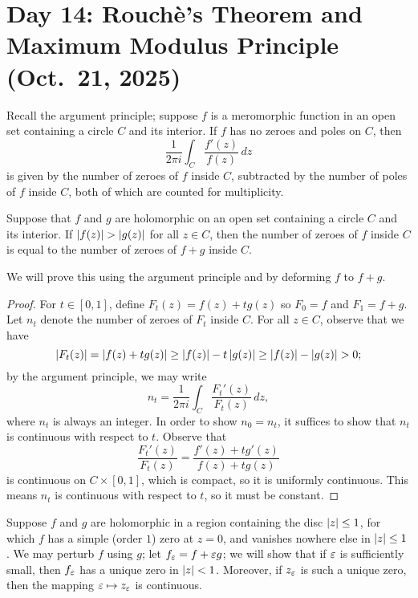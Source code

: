 \section{Day 14: Rouch\`e's Theorem and Maximum Modulus Principle (Oct.\ 21, 2025)}
Recall the argument principle; suppose $f$ is a meromorphic function in an open set containing a circle $C$ and its interior. If $f$ has no zeroes and poles on $C$, then
\[ \frac{1}{2\pi i} \int_C \frac{f'(z)}{f(z)} \, dz \]
is given by the number of zeroes of $f$ inside $C$, subtracted by the number of poles of $f$ inside $C$, both of which are counted for multiplicity.
\begin{theorem}
    Suppose that $f$ and $g$ are holomorphic on an open set containing a circle $C$ and its interior. If $\left\lvert f(z) \right\rvert > \left\lvert g(z) \right\rvert$ for all $z \in C$, then the number of zeroes of $f$ inside $C$ is equal to the number of zeroes of $f + g$ inside $C$.
\end{theorem}
\noindent We will prove this using the argument principle and by deforming $f$ to $f + g$.
\begin{proof}
    For $t \in [0, 1]$, define $F_t(z) = f(z) + tg(z)$ so $F_0 = f$ and $F_1 = f + g$. Let $n_t$ denote the number of zeroes of $F_t$ inside $C$. For all $z \in C$, observe that we have
    \[ \left\lvert F_t(z) \right\rvert = \left\lvert f(z) + tg(z) \right\rvert \geq \left\lvert f(z) \right\rvert - t \left\lvert g(z) \right\rvert \geq \left\lvert f(z) \right\rvert - \left\lvert g(z) \right\rvert > 0; \]
    by the argument principle, we may write
    \[ n_t = \frac{1}{2\pi i} \int_C \frac{F_t'(z)}{F_t(z)} \, dz, \]
    where $n_t$ is always an integer. In order to show $n_0 = n_t$, it suffices to show that $n_t$ is continuous with respect to $t$. Observe that
    \[ \frac{F_t'(z)}{F_t(z)} = \frac{f'(z) + tg'(z)}{f(z) + tg(z)} \]
    is continuous on $C \times [0, 1]$, which is compact, so it is uniformly continuous. This means $n_t$ is continuous with respect to $t$, so it must be constant.
\end{proof}
\begin{example}
    Suppose $f$ and $g$ are holomorphic in a region containing the disc $\left\lvert z \right\rvert \leq 1$, for which $f$ has a simple (order $1$) zero at $z = 0$, and vanishes nowhere else in $\left\lvert z \right\rvert \leq 1$. We may perturb $f$ using $g$; let $f_\varepsilon = f + \varepsilon g$; we will show that if $\varepsilon$ is sufficiently small, then $f_\varepsilon$ has a unique zero in $\left\lvert z \right\rvert < 1$. Moreover, if $z_\varepsilon$ is such a unique zero, then the mapping $\varepsilon \mapsto z_\varepsilon$ is continuous.
\end{example}
